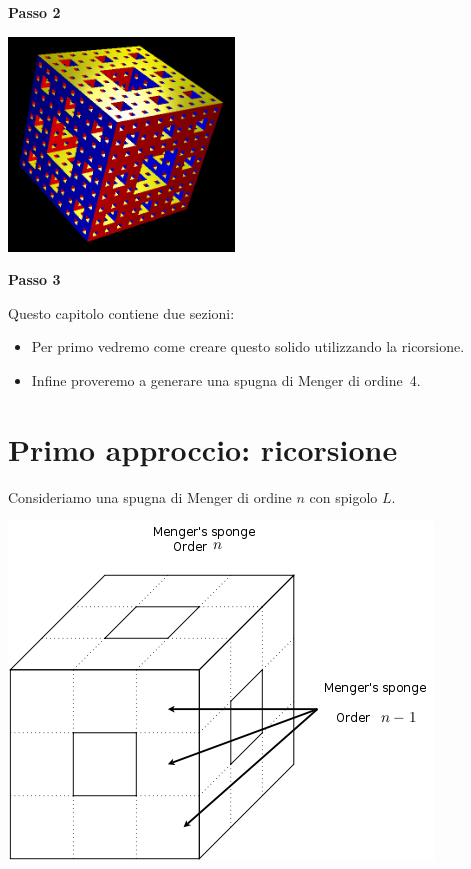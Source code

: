 \begin{center}
\begin{minipage}{6cm}
		\begin{center}
			\textbf{Passo 2}
		\end{center}
	\end{minipage}
	\begin{minipage}{6cm}
		\includegraphics[width=6cm]{pics/menger3.png}
		\begin{center}
			\textbf{Passo 3}
		\end{center}
	\end{minipage}
\end{center}

Questo capitolo contiene due sezioni:
\begin{itemize}
	\item Per primo vedremo come creare questo solido utilizzando la ricorsione.
	\item Infine proveremo a generare una spugna di Menger di ordine~4.
\end{itemize}



\section{Primo approccio: ricorsione}
Consideriamo una spugna di Menger di ordine $n$ con spigolo $L$.\\
\begin{center}
	\includegraphics{pics/menger-schema01.png}
\end{center}


